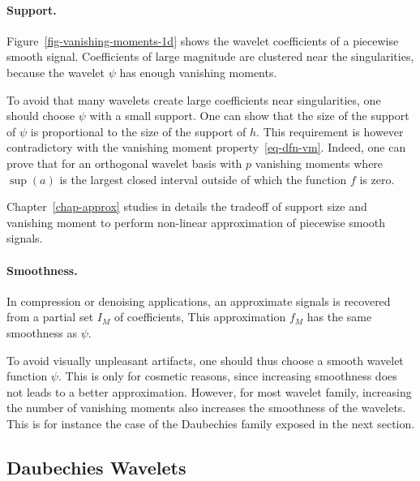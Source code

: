 \paragraph{Support.}

Figure~\ref{fig-vanishing-moments-1d} shows the wavelet coefficients of a piecewise smooth signal. Coefficients of large magnitude are clustered near the singularities, because the wavelet $\psi$ has enough vanishing moments.


To avoid that many wavelets create large coefficients near singularities, one should choose $\psi$ with a small support.
%
One can show that the size of the support of $\psi$ is proportional to the size of the support of $h$.
%
This requirement is however contradictory with the vanishing moment property~\eqref{eq-dfn-vm}. Indeed, one can prove that 
for an orthogonal wavelet basis with $p$ vanishing moments
where $\sup(a)$ is the largest closed interval outside of which the function $f$ is zero.


Chapter~\ref{chap-approx} studies in details the tradeoff of support size and vanishing moment to perform non-linear approximation of piecewise smooth signals.

\paragraph{Smoothness.}

In compression or denoising applications, an approximate signals is recovered from a partial set $I_M$ of coefficients, 
This approximation $f_M$ has the same smoothness as $\psi$. 

To avoid visually unpleasant artifacts, one should thus choose a smooth wavelet function $\psi$. This is only for cosmetic reasons, since increasing smoothness does not leads to a better approximation. However, for most wavelet family, increasing the number of vanishing moments also increases the smoothness of the wavelets. This is for instance the case of the Daubechies family exposed in the next section.


\subsection{Daubechies Wavelets}


